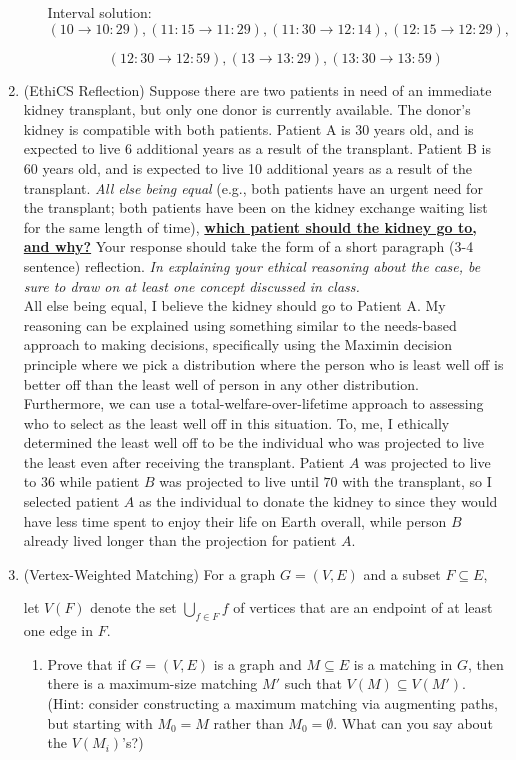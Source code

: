 \documentclass[11pt]{article}
\begin{document}
\begin{enumerate}
\begin{enumerate}
    Interval solution: 
    $$
    (10 \to 10:29), (11:15 \to 11:29), (11:30 \to 12:14), (12:15 \to 12:29), 
    $$
    
    $$
    (12:30 \to 12:59), (13 \to 13:29), (13:30 \to 13:59)
    $$

    
    \end{enumerate}

 \item (EthiCS Reflection) 
 Suppose there are two patients in need of an immediate kidney transplant, but only one donor is currently available. The donor’s kidney is compatible with both patients. Patient A is 30 years old, and is expected to live 6 additional years as a result of the transplant. Patient B is 60 years old, and is expected to live 10 additional years as a result of the transplant. {\em All else being equal} (e.g., both patients have an urgent need for the transplant; both patients have been on the kidney exchange waiting list for the same length of time), \underline{\textbf{which patient should the kidney go to, and why?}} Your response should take the form of a short paragraph (3-4 sentence) reflection. {\em In explaining your ethical reasoning about the case, be sure to draw on at least one concept discussed in class.} \\
 
 All else being equal, I believe the kidney should go to Patient A. My reasoning can be explained using something similar to the needs-based approach to making decisions, specifically using the Maximin decision principle where we pick a distribution where the person who is least well off is better off than the least well of person in any other distribution. Furthermore, we can use a total-welfare-over-lifetime approach to assessing who to select as the least well off in this situation. To, me, I ethically determined the least well off to be the individual who was projected to live the least even after receiving the transplant. Patient  $A$ was projected to live to $36$ while patient $B$ was projected to live until $70$ with the transplant, so I selected patient $A$ as the individual to donate the kidney to since they would have less time spent to enjoy their life on Earth overall, while person $B$ already lived longer than the projection for patient $A$.

 \item (Vertex-Weighted Matching)
        For a graph $G=(V,E)$ and a subset $F\subseteq E$, 

        let $V(F)$ denote the set $\bigcup_{f \in F}f$ of 
        vertices that are an endpoint of at least one edge in $F$.
        \begin{enumerate}
        \item Prove that if $G=(V,E)$ is a graph and $M\subseteq E$ is a matching in $G$, then there is a maximum-size matching $M'$ such that $V(M)\subseteq V(M')$.  (Hint: consider constructing a maximum matching via augmenting paths, but starting with $M_0=M$ rather than $M_0=\emptyset$. What can you say about the $V(M_i)$'s?) \label{part:monotonicity} \\
        

\end{enumerate}
\end{enumerate}
\end{document}
